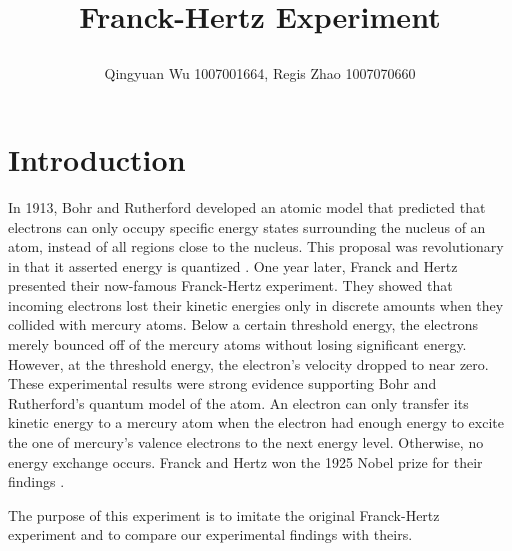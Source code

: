 \documentclass[12pt,twocolumn,letterpaper]{article}
\title{
		\usefont{OT1}{bch}{b}{n}

		\huge Franck-Hertz Experiment \\
}
\author[2]{Qingyuan Wu 1007001664, Regis Zhao 1007070660}
\begin{document}
\begin{strip} %
\maketitle
\tableofcontents
\end{strip}


\section{Introduction}
In 1913, Bohr and Rutherford developed an atomic model that predicted that electrons can only occupy specific energy states surrounding the nucleus of an atom, instead of all regions close to the nucleus. This proposal was revolutionary in that it asserted energy is quantized \cite{bohr}. One year later, Franck and Hertz presented their now-famous Franck-Hertz experiment. They showed that incoming electrons lost their kinetic energies only in discrete amounts when they collided with mercury atoms. Below a certain threshold energy, the electrons merely bounced off of the mercury atoms without losing significant energy. However, at the threshold energy, the electron's velocity dropped to near zero. These experimental results were strong evidence supporting Bohr and Rutherford's quantum model of the atom. An electron can only transfer its kinetic energy to a mercury atom when the electron had enough energy to excite the one of mercury's valence electrons to the next energy level. Otherwise, no energy exchange occurs. Franck and Hertz won the 1925 Nobel prize for their findings \cite{franckhertzwiki}.

The purpose of this experiment is to imitate the original Franck-Hertz experiment and to compare our experimental findings with theirs.
\end{document}
